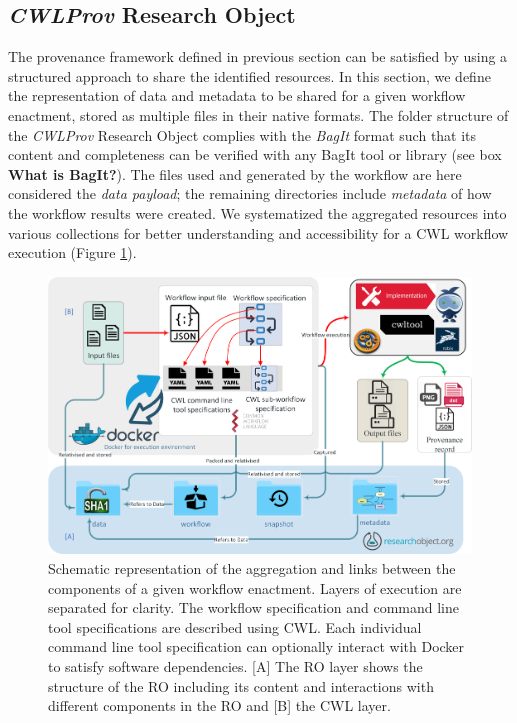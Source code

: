 \documentclass[a4paper,num-refs]{oup-contemporary}
\begin{document}
\subsection{\textit{CWLProv} Research Object} \label{sec:cwlprovRO}
The provenance framework defined in previous section can be satisfied by using a structured approach to share the identified resources. In this section, we define the representation of data and metadata to be shared for a given workflow enactment, stored as multiple files in their native formats. The folder structure of the \textit{CWLProv} Research Object complies with the \emph{BagIt} \citep{bagit17} format such that its content and completeness can be verified with any BagIt tool or library (see box \textbf{What is BagIt?}). The files used and generated by the workflow are here considered the \emph{data payload}; the remaining directories include \emph{metadata} of how the workflow results were created. We systematized the aggregated resources into various collections for better understanding and accessibility for a CWL workflow execution (Figure \ref{fig:RO-format}). 
\begin{figure} %
\centering
    \includegraphics[width=.7\textwidth]{images/RO-structure-NEW-file}
    \captionsetup{justification=centering}
\caption{Schematic representation of the aggregation and links between the components of a given workflow enactment. Layers of execution are separated for clarity. The workflow specification and command line tool specifications are described using CWL. Each individual command line tool specification can optionally interact with Docker to satisfy software dependencies. [A] The RO layer shows the structure of the RO including its content and interactions with different components in the RO and [B] the CWL layer. }\label{fig:RO-format}
\end{figure}
\end{document}

